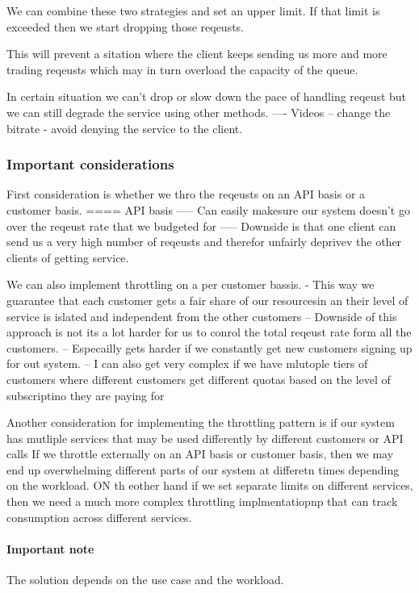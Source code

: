 \documentclass[a4paper, 11pt]{book}
\begin{document}
{    We can combine these two strategies and set an upper limit.
    If that limit is exceeded then we start dropping those reqeusts.

    This will prevent a sitation where the client keeps sending us more and more trading reqeusts which may in turn overload the capacity of the queue.

    In certain situation we can't drop or slow down the pace of handling reqeust but we can still degrade the service using other methods.
    ---- Videos -- change the bitrate - avoid denying the service to the client.

    \subsubsection{Important considerations}
    First consideration is whether we thro the reqeusts on an API basis or a customer basis.
    ==== API basis
    ----- Can easily makesure our system doesn't go over the reqeust rate that we budgeted for
    ----- Downside is that one client can send us a very high number of reqeusts and therefor unfairly deprivev the other clients of getting service.

    We can also implement throttling on a per customer bassis.
    - This way we guarantee that each customer gets a fair share of our resourcesin an their level of service is islated and independent from the other customers
    -- Downside of this approach is not its a lot harder for us to conrol the total reqeust rate form all the customers.
    -- Especailly gets harder if we constantly get new customers signing up for out system.
    -- I can also get very complex if we have mlutople tiers of customers where different customers get different quotas based on the level of subscriptino they are paying for

    Another consideration for implementing the throttling pattern is if our system has mutliple services that may be used differently by different customers or API calls
    If we throttle externally on an API basis or customer basis, then we may end up overwhelming different parts of our system at differetn times depending on the workload.
    ON th eother hand if we set separate limits on different services, then we need a much more complex throttling implmentatiopnp that can track consumption across different services.

    \paragraph{Important note}
    The solution depends on the use case and the workload.

}
\end{document}
